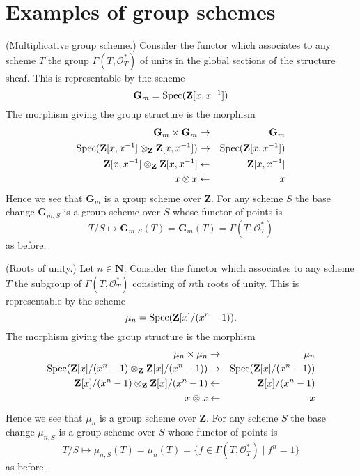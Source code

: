 \section{Examples of group schemes}
\label{section-examples-group-schemes}

\begin{example}
\label{example-multiplicative-group}
(Multiplicative group scheme.)
Consider the functor which associates
to any scheme $T$ the group $\Gamma(T, \mathcal{O}_T^*)$
of units in the global sections of the structure sheaf.
This is representable by the scheme
$$
\mathbf{G}_m = \mathop{\rm Spec}(\mathbf{Z}[x, x^{-1}])
$$
The morphism giving the group structure is the morphism
\begin{eqnarray*}
\mathbf{G}_m \times \mathbf{G}_m & \to & \mathbf{G}_m \\
\mathop{\rm Spec}(\mathbf{Z}[x, x^{-1}] \otimes_{\mathbf{Z}} \mathbf{Z}[x, x^{-1}])
& \to &
\mathop{\rm Spec}(\mathbf{Z}[x, x^{-1}]) \\
\mathbf{Z}[x, x^{-1}] \otimes_{\mathbf{Z}} \mathbf{Z}[x, x^{-1}]
& \leftarrow &
\mathbf{Z}[x, x^{-1}] \\
x \otimes x & \leftarrow & x
\end{eqnarray*}
Hence we see that $\mathbf{G}_m$ is a group scheme over $\mathbf{Z}$.
For any scheme $S$ the base change $\mathbf{G}_{m, S}$ is a
group scheme over $S$ whose functor of points is
$$
T/S
\longmapsto
\mathbf{G}_{m, S}(T) = \mathbf{G}_m(T) = \Gamma(T, \mathcal{O}_T^*)
$$
as before.
\end{example}

\begin{example}
\label{example-roots-of-unity}
(Roots of unity.)
Let $n \in \mathbf{N}$.
Consider the functor which associates
to any scheme $T$ the subgroup of $\Gamma(T, \mathcal{O}_T^*)$
consisting of $n$th roots of unity.
This is representable by the scheme
$$
\mu_n = \mathop{\rm Spec}(\mathbf{Z}[x]/(x^n - 1)).
$$
The morphism giving the group structure is the morphism
\begin{eqnarray*}
\mu_n \times \mu_n & \to & \mu_n \\
\mathop{\rm Spec}(
\mathbf{Z}[x]/(x^n - 1)
\otimes_{\mathbf{Z}}
\mathbf{Z}[x]/(x^n - 1))
& \to &
\mathop{\rm Spec}(\mathbf{Z}[x]/(x^n - 1)) \\
\mathbf{Z}[x]/(x^n - 1) \otimes_{\mathbf{Z}} \mathbf{Z}[x]/(x^n - 1)
& \leftarrow &
\mathbf{Z}[x]/(x^n - 1) \\
x \otimes x & \leftarrow & x
\end{eqnarray*}
Hence we see that $\mu_n$ is a group scheme over $\mathbf{Z}$.
For any scheme $S$ the base change $\mu_{n, S}$ is a
group scheme over $S$ whose functor of points is
$$
T/S
\longmapsto
\mu_{n, S}(T) = \mu_n(T) = \{f \in \Gamma(T, \mathcal{O}_T^*) \mid f^n = 1\}
$$
as before.
\end{example}


